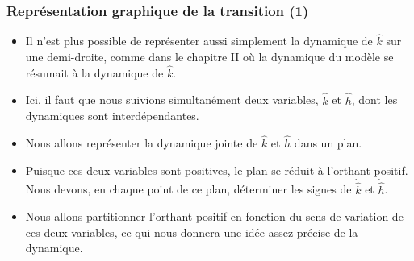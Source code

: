 \documentclass[10pt,notheorems]{beamer}
\theoremstyle{plain}
\theoremstyle{definition} %
\begin{document}
\begin{frame}
  \frametitle{Représentation graphique de la transition (1)}

  \begin{itemize}

  \item Il n'est plus possible de représenter aussi simplement la dynamique de $\hat k$ sur une demi-droite, comme dans le chapitre II où la dynamique du modèle se résumait à la dynamique de $\hat k$.\newline

  \item Ici, il faut que nous suivions simultanément deux variables, $\hat k$ et $\hat h$, dont les dynamiques sont interdépendantes.\newline

  \item Nous allons représenter la dynamique jointe de $\hat k$ et $\hat h$ dans un plan.\newline

  \item Puisque ces deux variables sont positives, le plan se réduit à l'orthant positif. Nous devons, en chaque point de ce plan, déterminer les signes de $\dot{\hat k}$ et $\dot{\hat h}$.\newline

  \item Nous allons partitionner l'orthant positif en fonction du sens de variation de ces deux variables, ce qui nous donnera une idée assez précise de la dynamique.

  \end{itemize}

\end{frame}
\end{document}
